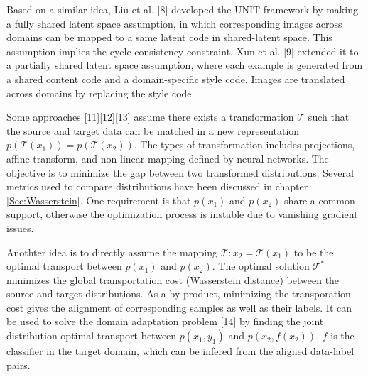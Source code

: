 \documentclass{article}
\begin{document}
Based on a similar idea, Liu et al. [8] developed the UNIT framework by making a fully shared latent space assumption, in which corresponding images across domains can be mapped to a same latent code in shared-latent space. This assumption implies the cycle-consistency constraint. Xun et al. [9] extended it to a partially shared latent space assumption, where each example is generated from a shared content code and a domain-specific style code. Images are translated across domains by replacing the style code.


Some approaches [11][12][13] assume there exists a transformation $\mathcal{T}$ such that the source and target data can be matched in a new representation $p(\mathcal{T}(x_1)) = p(\mathcal{T}(x_2))$. The types of transformation includes projections, affine transform, and non-linear mapping defined by neural networks. The objective is to minimize the gap between two transformed distributions. Several metrics used to compare distributions have been discussed in chapter \ref{Sec:Wasserstein}. One requirement is that $p(x_1)$ and $p(x_2)$ share a common support, otherwise the optimization process is instable due to vanishing gradient issues.

Anothter idea is to directly assume the mapping $\mathcal{T}: x_2 = \mathcal{T}(x_1)$ to be the optimal transport between $p(x_1)$ and $p(x_2)$. The optimal solution $\mathcal{T}^*$ minimizes the global transportation cost (Wasserstein distance) between the source and target distributions. As a by-product, minimizing the transporation cost gives the alignment of corresponding samples as well as their labels. It can be used to solve the domain adaptation problem [14] by finding the joint distribution optimal transport between $p(x_1, y_1)$ and $p(x_2, f(x_2))$. $f$ is the classifier in the target domain, which can be infered from the aligned data-label pairs.
\end{document}

